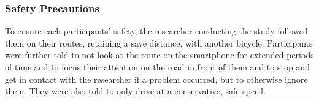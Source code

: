 \subsubsection*{Safety Precautions}

To ensure each participants' safety, the researcher conducting the study followed them on their routes, retaining a save distance, with another bicycle.
Participants were further told to not look at the route on the smartphone for extended periods of time and to focus their attention on the road in front of them and to stop and get in contact with the researcher if a problem occurred, but to otherwise ignore them.
They were also told to only drive at a conservative, safe speed.
